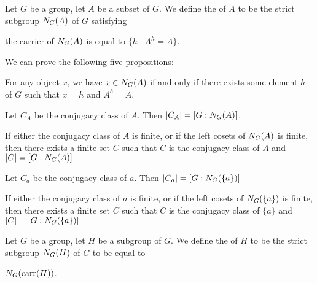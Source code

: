 \documentclass{article}
\begin{document}
\begin{definition}
Let $G$ be a group, let $A$ be a subset of $G$. We define
the  of $A$ to be the strict subgroup
$N_{G}(A)$ of $G$ satisfying
\begin{defn}
\item the carrier of $N_{G}(A)$ is equal to $\{h\mid A^{h}=A\}$.
\end{defn}
\end{definition}

We can prove the following five propositions:
\begin{thm}
\item\label{group3:129} For any object $x$, we have
  $x\in N_{G}(A)$ if and only if there exists some element $h$
  of $G$ such that $x=h$ and $A^{h}=A$.
\item\label{group3:130} Let $C_{A}$ be the conjugacy class of $A$. Then
  $|C_{A}|=[G : N_{G}(A)]$.
\item\label{group3:131} If either the conjugacy class of $A$ is finite,
  or if the left cosets of $N_{G}(A)$ is finite, then there
  exists a finite set $C$ such that $C$ is the conjugacy class of $A$
  and $|C|=[G : N_{G}(A)]$
\item\label{group3:132} Let $C_{a}$ be the conjugacy class of $a$. Then $|C_{a}|=[G : N_{G}(\{a\})]$
\item\label{group3:133} If either the conjugacy class of $a$ is finite,
  or if the left cosets of $N_{G}(\{a\})$ is finite, then there
  exists a finite set $C$ such that $C$ is the conjugacy class of $\{a\}$
  and $|C|=[G : N_{G}(\{a\})]$
\end{thm}

\begin{definition}
Let $G$ be a group, let $H$ be a subgroup of $G$.
We define the  of $H$ to be the strict subgroup
$N_{G}(H)$ of $G$ to be equal to
\begin{defn}
\item $N_{G}(\operatorname{carr}(H))$.
\end{defn}
\end{definition}
\end{document}
